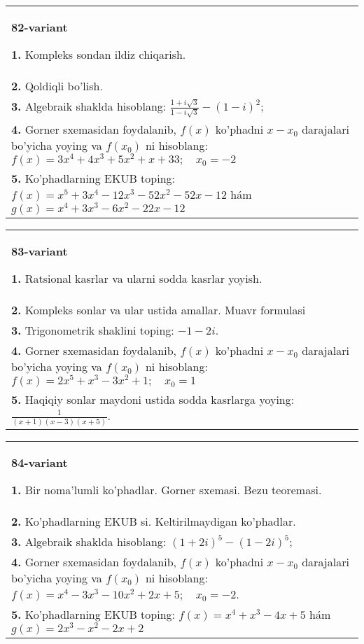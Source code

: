 \documentclass{article}
\begin{document}
\begin{tabular}{m{17cm}}
\textbf{82-variant}
\newline

\textbf{1.} Kompleks sondan ildiz chiqarish. \\
\textbf{2.} Qoldiqli bo’lish.  \\
\textbf{3.} Algebraik shaklda hisoblang: $\frac{1+i \sqrt{3}}{1-i \sqrt{3}}-(1-i)^2$; \\
\textbf{4.} Gorner sxemasidan foydalanib, $f(x)$ ko’phadni $x-x_0$ darajalari bo’yicha yoying va $f\left(x_0\right)$ ni hisoblang: $f(x)=3 x^4+4 x^3+5 x^2+x+33 ; \quad x_0=-2$ \\
\textbf{5.} Ko’phadlarning EKUB toping:  $f(x)=x^5+3 x^4-12 x^3-52 x^2-52 x-12$ hám $g(x)=x^4+3 x^3-6 x^2-22 x-12$ \\

\end{tabular}
\vspace{1cm}


\begin{tabular}{m{17cm}}
\textbf{83-variant}
\newline

\textbf{1.} Ratsional kasrlar va ularni sodda kasrlar yoyish. \\
\textbf{2.} Kompleks sonlar va ular ustida amallar. Muavr formulasi  \\
\textbf{3.} Trigonometrik shaklini toping: $-1-2 i$. \\
\textbf{4.} Gorner sxemasidan foydalanib, $f(x)$ ko’phadni $x-x_0$ darajalari bo’yicha yoying va $f\left(x_0\right)$ ni hisoblang:  $f(x)=2 x^5+x^3-3 x^2+1 ; \quad x_0=1$ \\
\textbf{5.} Haqiqiy sonlar maydoni ustida sodda kasrlarga yoying:  $\frac{1}{(x+1)(x-3)(x+5)}$. \\

\end{tabular}
\vspace{1cm}


\begin{tabular}{m{17cm}}
\textbf{84-variant}
\newline

\textbf{1.} Bir noma’lumli ko’phadlar. Gorner sxemasi. Bezu teoremasi.  \\
\textbf{2.} Ko’phadlarning EKUB si. Keltirilmaydigan ko’phadlar. \\
\textbf{3.} Algebraik shaklda hisoblang: $(1+2 i)^5-(1-2 i)^5$; \\
\textbf{4.} Gorner sxemasidan foydalanib, $f(x)$ ko’phadni $x-x_0$ darajalari bo’yicha yoying va $f\left(x_0\right)$ ni hisoblang: $f(x)=x^4-3 x^3-10 x^2+2 x+5 ; \quad x_0=-2$. \\
\textbf{5.} Ko’phadlarning EKUB toping:  $f(x)=x^4+x^3-4 x+5$ hám $g(x)=2 x^3-x^2-2 x+2$ \\

\end{tabular}
\vspace{1cm}
\end{document}
